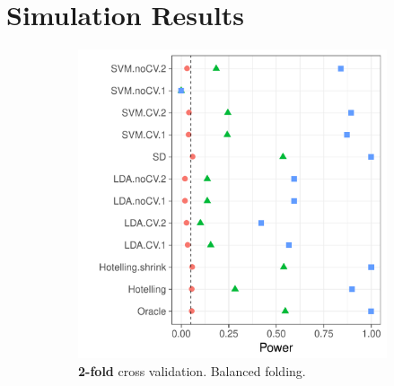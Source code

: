\documentclass[12pt,a4paper]{article}
\begin{document}
\newpage
\section{Simulation Results}
\label{apx:simulations}







\begin{figure}[h]
\centering
\caption{\mycaption}	
\label{fig:n_folds}
	\begin{subfigure}{.5\textwidth}
	  \centering
	  \includegraphics[width=1\linewidth]{"art/file4"}
	  \caption{\textbf{2-fold} cross validation. Balanced folding.}  
	\label{fig:n_folds_1}
	\end{subfigure}%
	\begin{subfigure}{.5\textwidth}
	  \centering

\end{subfigure}
\end{figure}
\end{document}
